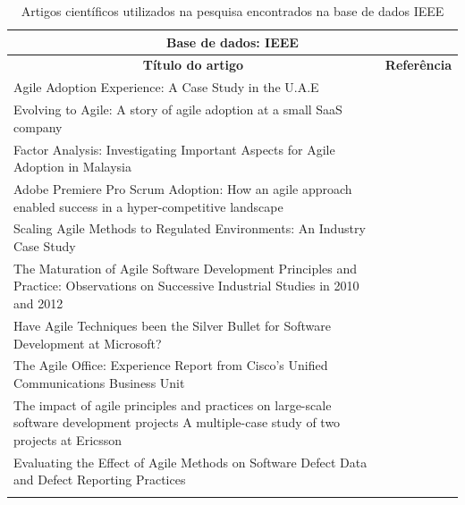 \begin{table}
	\centering
	\captionsetup{justification=centering,margin=1cm}
	\begin{tabularx}{\linewidth}{ | X | p{3cm} | } \hline \multicolumn{2}{|c|}{\textbf{Base de dados: IEEE}} \\ \hline
	\multicolumn{1}{|c|}{\textbf{Título do artigo}} & \multicolumn{1}{|c|}{\textbf{Referência}} \\ \hline
		Agile Adoption Experience: A Case Study in the U.A.E & \cite{Hajjdiab2011} \\ \hline
		Evolving to Agile: A story of agile adoption at a small SaaS company & \cite{Block2011} \\ \hline
		Factor Analysis: Investigating Important Aspects for Agile Adoption in Malaysia & \cite{Asnawi2012} \\ \hline
		Adobe Premiere Pro Scrum Adoption: How an agile approach enabled success in a hyper-competitive landscape & \cite{Adobe2012} \\ \hline
		Scaling Agile Methods to Regulated Environments: An Industry Case Study & \cite{Fitzgerald2013} \\ \hline
		The Maturation of Agile Software Development Principles and Practice: Observations on Successive Industrial Studies in 2010 and 2012 & \cite{Bustard2013} \\ \hline
		Have Agile Techniques been the Silver Bullet for Software Development at Microsoft? & \cite{Microsoft2013} \\ \hline
		The Agile Office: Experience Report from Cisco’s Unified Communications Business Unit & \cite{Cisco2011} \\ \hline
		The impact of agile principles and practices on large-scale software development projects A multiple-case study of two projects at Ericsson & \cite{Ericsson2013} \\ \hline
		Evaluating the Effect of Agile Methods on Software Defect Data and Defect Reporting Practices & \cite{Korhonen2010} \\ \hline
	\caption{Artigos científicos utilizados na pesquisa encontrados na base de dados IEEE}
	\label{tab:artigosIEEE}
	\end{tabularx}
\end{table}

